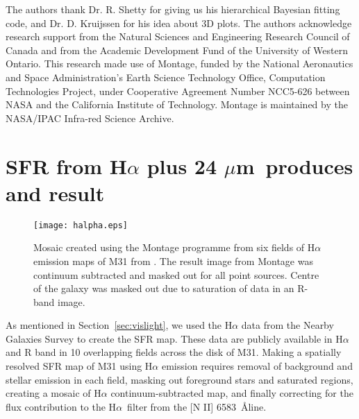 \documentclass[useAMS,usenatbib]{mn2e}
\newcommand \halpha    {H$\alpha $\ }
\newcommand \um    {$\mu$m\ }
\begin{document}
The authors thank Dr. R. Shetty for giving us his hierarchical Bayesian fitting code, and Dr. D. Kruijssen for his idea about 3D plots.
The authors acknowledge research support from the Natural Sciences and Engineering Research Council of Canada and from the Academic Development Fund of the University of Western Ontario. 
This research made use of Montage, funded by the National Aeronautics and Space Administration's Earth Science Technology Office, Computation Technologies Project, under Cooperative Agreement Number NCC5-626 between NASA and the California Institute of Technology. Montage is maintained by the NASA/IPAC Infra-red Science Archive.



\appendix
\section{SFR from H$\alpha$ plus 24 \um produces and result}
\label{app:halpha}


\begin{figure*}
\centering
\texttt{[image: halpha.eps]}
\caption{Mosaic created using the Montage programme from six fields of H$\alpha$ emission maps of M31 from \cite{Massey07}. The result image from Montage was continuum subtracted and masked out for all point sources. Centre of the galaxy was masked out due to saturation of data in an R-band image.}
\label{fig:halpha}
\end{figure*}

As mentioned in Section~\ref{sec:vislight}, we used the H$\alpha$ data from the Nearby Galaxies Survey \citep{Massey07} to create the SFR map. These data are publicly available in H$\alpha$ and R band in 10 overlapping fields across the disk of M31. Making a spatially resolved SFR map of M31 using H$\alpha$ emission requires removal of background and stellar emission in each field, masking out foreground stars and saturated regions, creating a mosaic of H$\alpha$ continuum-subtracted map, and finally correcting for the flux contribution to the \halpha filter from the [N II] 6583~\AA line.
\end{document}
